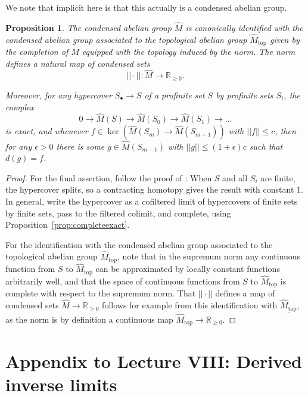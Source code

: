 \documentclass[11pt]{amsbook}
\numberwithin{equation}{section}
\numberwithin{theorem}{section}
\newtheorem{proposition}[theorem]{Proposition}
\theoremstyle{definition}
\begin{document}
We note that implicit here is that this actually is a condensed abelian group.

\begin{proposition}\label{prop:normedcompletion} The condensed abelian group $\widehat{M}$ is canonically identified with the condensed abelian group associated to the topological abelian group $\widehat{M}_{\mathrm{top}}$ given by the completion of $M$ equipped with the topology induced by the norm. The norm defines a natural map of condensed sets
\[
||\cdot||: \widehat{M}\to \mathbb R_{\geq 0}.
\]

Moreover, for any hypercover $S_\bullet\to S$ of a profinite set $S$ by profinite sets $S_i$, the complex
\[
0\to \widehat{M}(S)\to \widehat{M}(S_0)\to \widehat{M}(S_1)\to \ldots
\]
is exact, and whenever $f\in \ker(\widehat{M}(S_m)\to \widehat{M}(S_{m+1}))$ with $||f||\leq c$, then for any $\epsilon>0$ there is some $g\in \widehat{M}(S_{m-1})$ with $||g||\leq (1+\epsilon)c$ such that $d(g)=f$.
\end{proposition}

\begin{proof} For the final assertion, follow the proof of \cite[Theorem 3.3]{Condensed}: When $S$ and all $S_i$ are finite, the hypercover splits, so a contracting homotopy gives the result with constant $1$. In general, write the hypercover as a cofiltered limit of hypercovers of finite sets by finite sets, pass to the filtered colimit, and complete, using Proposition~\ref{prop:completeexact}.

For the identification with the condensed abelian group associated to the topological abelian group $\widehat{M}_{\mathrm{top}}$, note that in the supremum norm any continuous function from $S$ to $\widehat{M}_{\mathrm{top}}$ can be approximated by locally constant functions arbitrarily well, and that the space of continuous functions from $S$ to $\widehat{M}_{\mathrm{top}}$ is complete with respect to the supremum norm. That $||\cdot||$ defines a map of condensed sets $\widehat{M}\to \mathbb R_{\geq 0}$ follows for example from this identification with $\underline{\widehat{M}_{\mathrm{top}}}$, as the norm is by definition a continuous map $\widehat{M}_{\mathrm{top}}\to \mathbb R_{\geq 0}$.
\end{proof}


\newpage

\section*{Appendix to Lecture VIII: Derived inverse limits}
\end{document}
